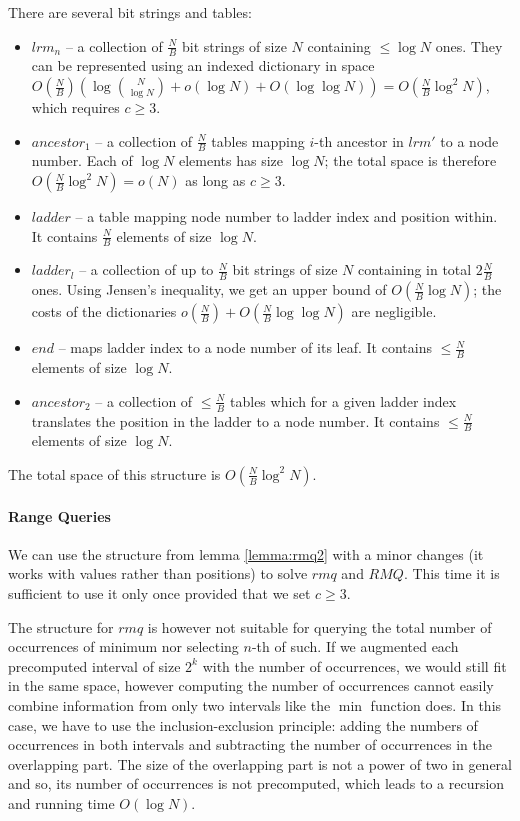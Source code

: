 There are several bit strings and tables:
\begin{itemize}
	\item $lrm_n$ -- a collection of $\frac{N}{B}$ bit strings of size $N$ containing $\le \log N$ ones.
	They can be represented using an indexed dictionary in space $O(\frac{N}{B}) (\log {N \choose \log N} + o(\log N) + O(\log \log N)) = O(\frac{N}{B} \log^2 N)$, which requires $c \ge 3$.
	\item $ancestor_1$ -- a collection of $\frac{N}{B}$ tables mapping $i$-th ancestor in $lrm'$ to a node number.
	Each of $\log N$ elements has size $\log N$; the total space is therefore $O(\frac{N}{B} \log^2 N) = o(N)$ as long as $c \ge 3$.
	\item $ladder$ -- a table mapping node number to ladder index and position within.
	It contains $\frac{N}{B}$ elements of size $\log{N}$.
	\item $ladder_l$ -- a collection of up to $\frac{N}{B}$ bit strings of size $N$ containing in total $2 \frac{N}{B}$ ones.
	Using Jensen's inequality, we get an upper bound of $O(\frac{N}{B} \log N)$; the costs of the dictionaries $o(\frac{N}{B}) + O(\frac{N}{B} \log \log N)$ are negligible.
	\item $end$ -- maps ladder index to a node number of its leaf.
	It contains $\le \frac{N}{B}$ elements of size $\log{N}$.
	\item $ancestor_2$ -- a collection of $\le \frac{N}{B}$ tables which for a given ladder index translates the position in the ladder to a node number.
	It contains $\le \frac{N}{B}$ elements of size $\log{N}$.
\end{itemize}
The total space of this structure is $O(\frac{N}{B} \log^2 N)$.

\paragraph{Range Queries}

We can use the structure from lemma \ref{lemma:rmq2} with a minor changes (it works with values rather than positions) to solve $rmq$ and $RMQ$.
This time it is sufficient to use it only once provided that we set $c \ge 3$.

The structure for $rmq$ is however not suitable for querying the total number of occurrences of minimum nor selecting $n$-th of such.
If we augmented each precomputed interval of size $2^k$ with the number of occurrences, we would still fit in the same space, however computing the number of occurrences cannot easily combine information from only two intervals like the $\min$ function does.
In this case, we have to use the inclusion-exclusion principle: adding the numbers of occurrences in both intervals and subtracting the number of occurrences in the overlapping part.
The size of the overlapping part is not a power of two in general and so, its number of occurrences is not precomputed, which leads to a recursion and running time $O(\log N)$.

